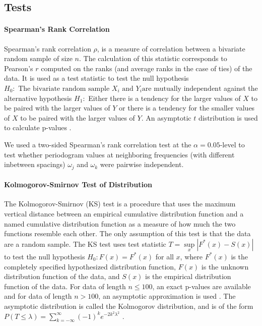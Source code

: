 \documentclass{article}\usepackage{graphicx, color}
\theoremstyle{plain}
\begin{document}
\subsection{Tests}



\paragraph{Spearman's Rank Correlation}
Spearman's rank correlation $\rho$, is a measure of correlation between a bivariate random sample of size $n$. The calculation of this statistic corresponds to Pearson's $r$ computed on the ranks (and average ranks in the case of ties) of the data. It is used as a test statistic to test the null hypothesis $H_0: \text{ The bivariate random sample } X_i \text{ and } Y_i \text{are mutually independent}$ against the alternative hypothesis $H_1:$ Either there is a tendency for the larger values of $X$ to be paired with the larger values of $Y$ or there is a tendency for the smaller values of $X$ to be paired with the larger values of $Y$. An asymptotic $t$ distribution is used to calculate p-values \cite{conover1998practical}.

We used a two-sided Spearman's rank correlation test at the $\alpha = 0.05$-level to test whether periodogram values at neighboring frequencies (with different inbetween spacings) $\omega_j$ and $\omega_k$ were pairwise independent.


\paragraph{Kolmogorov-Smirnov Test of Distribution}
The Kolmogorov-Smirnov (KS) test is a procedure that uses the maximum vertical distance between an empirical cumulative distribution function and a named cumulative distribution function as a measure of how much the two functions resemble each other. The only assumption of this test is that the data are a random sample. The KS test uses test statistic $T = \sup\limits_x |F^*(x) - S(x)|$ to test the null hypothesis $H_0: F(x) = F^*(x)$ for all $x$, where $F^*(x)$ is the completely specified hypothesized distribution function, $F(x)$ is the unknown distribution function of the data, and $S(x)$ is the empirical distribution function of the data. For data of length $n \le 100$, an exact p-values are available and for data of length $n > 100$, an asymptotic approximation is used \cite{conover1998practical}. The asymptotic distribution is called the Kolmogorov distribution, and is of the form $P(T \le \lambda) = \sum_{k=-\infty}^\infty (-1)^k e^{-2k^2 \lambda^2}$ \cite{kolmogorov1992empirical}.
\end{document}
